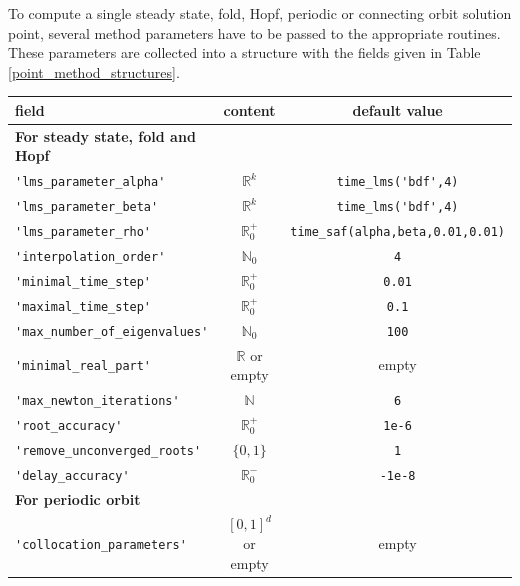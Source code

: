 \documentclass[10pt]{scrartcl}
\newcommand{\RR}{\mathbb{R}}
\newcommand{\NN}{\mathbb{N}}
\newcommand{\blist}[1]{\mbox{\lstinline!#1!}}
\begin{document}
To compute a single steady state, fold, Hopf, periodic 
or connecting
orbit solution point,
several method parameters have to be passed to the appropriate routines.
These parameters are collected into a structure with the fields
given in Table \ref{point_method_structures}.
\begin{table}[htbp]
\begin{center}
\begin{tabular}{l@{\hspace*{1em}}c@{\hspace*{1em}}c}\hline\noalign{\smallskip}
 field                        & content              & default value  \\\hline\noalign{\smallskip} 
\textbf{For steady state, fold and Hopf}\\\noalign{\smallskip}
\blist{'lms_parameter_alpha'}        & $\RR^k$              & \blist{time_lms('bdf',4)} \\
\blist{'lms_parameter_beta'}         & $\RR^k$              & \blist{time_lms('bdf',4)} \\
\blist{'lms_parameter_rho'}          & $\RR^+_0$            & \blist{time_saf(alpha,beta,0.01,0.01)} \\
\blist{'interpolation_order'}         & $\NN_0$              & \blist{4} \\
\blist{'minimal_time_step'}          & $\RR^+_0$            & \blist{0.01} \\
\blist{'maximal_time_step'}          & $\RR^+_0$            & \blist{0.1} \\
\blist{'max_number_of_eigenvalues'} & $\NN_0$              & \blist{100} \\
\blist{'minimal_real_part'}          & $\RR$ or empty       & empty \\
\blist{'max_newton_iterations'}      & $\NN$                & \blist{6} \\ 
\blist{'root_accuracy'}               & $\RR^+_0$            & \blist{1e-6} \\
\blist{'remove_unconverged_roots'}   & $\{0,1\}$            & \blist{1} \\
\blist{'delay_accuracy'}              & $\RR_0^-$            & \blist{-1e-8}
\\\noalign{\medskip}
\textbf{For periodic orbit}\\\noalign{\smallskip}
\blist{'collocation_parameters'}      & $[0,1]^d$ or empty   & empty \\

\end{tabular}
\end{center}
\end{table}
\end{document}
